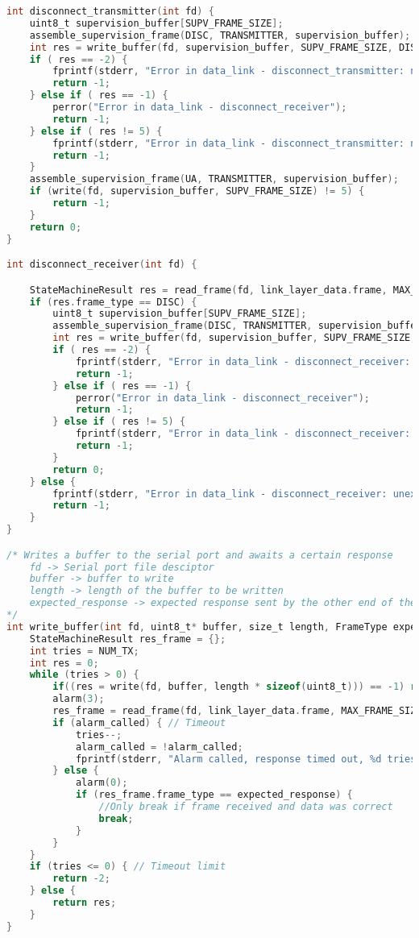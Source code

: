 \begin{lstlisting}[language=C, caption=data_link.c]
int disconnect_transmitter(int fd) {
    uint8_t supervision_buffer[SUPV_FRAME_SIZE];
    assemble_supervision_frame(DISC, TRANSMITTER, supervision_buffer);
    int res = write_buffer(fd, supervision_buffer, SUPV_FRAME_SIZE, DISC); 
    if ( res == -2) {
        fprintf(stderr, "Error in data_link - disconnect_transmitter: no. tries exceeded\n");
        return -1;
    } else if ( res == -1) {
        perror("Error in data_link - disconnect_receiver");
        return -1;
    } else if ( res != 5) {
        fprintf(stderr, "Error in data_link - disconnect_transmitter: no. bytes written not matching expected\n");
        return -1;
    }
    assemble_supervision_frame(UA, TRANSMITTER, supervision_buffer);
    if (write(fd, supervision_buffer, SUPV_FRAME_SIZE) != 5) {
        return -1;
    }
    return 0;
}

int disconnect_receiver(int fd) {

    StateMachineResult res = read_frame(fd, link_layer_data.frame, MAX_FRAME_SIZE);
    if (res.frame_type == DISC) {
        uint8_t supervision_buffer[SUPV_FRAME_SIZE];
        assemble_supervision_frame(DISC, TRANSMITTER, supervision_buffer);
        int res = write_buffer(fd, supervision_buffer, SUPV_FRAME_SIZE, UA); 
        if ( res == -2) {
            fprintf(stderr, "Error in data_link - disconnect_receiver: no. tries exceeded\n");
            return -1;
        } else if ( res == -1) {
            perror("Error in data_link - disconnect_receiver");
            return -1;
        } else if ( res != 5) {
            fprintf(stderr, "Error in data_link - disconnect_receiver: no. bytes written not matching expected\n");
            return -1;
        }
        return 0;
    } else {
        fprintf(stderr, "Error in data_link - disconnect_receiver: unexpected frame type\n");
        return -1;
    }
}

/* Writes a buffer to the serial port and awaits a certain response
    fd -> Serial port file desciptor
    buffer -> buffer to write
    length -> length of the buffer to be written
    expected_response -> expected response sent by the other end of the serial port
*/
int write_buffer(int fd, uint8_t* buffer, size_t length, FrameType expected_response) {
    StateMachineResult res_frame = {};
    int tries = NUM_TX;
    int res = 0;
    while (tries > 0) {
        if((res = write(fd, buffer, length * sizeof(uint8_t))) == -1) return -1; // Writes buffer to serial port
        alarm(3);
        res_frame = read_frame(fd, link_layer_data.frame, MAX_FRAME_SIZE); // Reads response
        if (alarm_called) { // Timeout
            tries--;
            alarm_called = !alarm_called;
            fprintf(stderr, "Alarm called, response timed out, %d tries left\n", tries);
        } else {
            alarm(0);
            if (res_frame.frame_type == expected_response) {
                //Only break if frame received and data was correct
                break;
            }
        }
    }
    if (tries <= 0) { // Timeout limit 
        return -2;
    } else {
        return res;
    }
}


\end{lstlisting}
